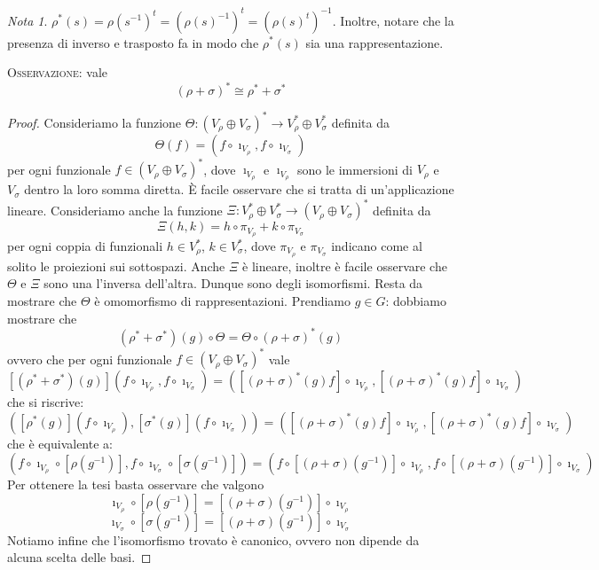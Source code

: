 \documentclass[11pt]{article}
\theoremstyle{plain}
\theoremstyle{definition}
\theoremstyle{remark}
\newtheorem*{note}{Nota}
\begin{document}
\begin{note}
$\rho^*(s)=\rho(s^{-1})^t=\left(\rho(s)^{-1}\right)^t=\left(\rho(s)^t\right)^{-1}$. Inoltre, notare che la presenza di inverso e trasposto fa in modo che $\rho^*(s)$ sia una rappresentazione.
\end{note}


\textsc{Osservazione:} vale
\[ (\rho + \sigma)^* \cong \rho^* + \sigma^* \]
\begin{proof}
Consideriamo la funzione $\Theta : (V_\rho \oplus V_\sigma)^*\to V_\rho ^* \oplus V_\sigma ^*$ definita da
\[ \Theta(f) = (f\circ \imath_{V_\rho}, f\circ \imath_{V_\sigma}) \]
per ogni funzionale $f\in (V_\rho \oplus V_\sigma)^*$, dove $\imath_{V_\rho}$ e $\imath_{V_\rho}$ sono le immersioni di $V_\rho$ e $V_\sigma$ dentro la loro somma diretta.
\`E facile osservare che si tratta di un'applicazione lineare. Consideriamo anche
la funzione $\Xi: V_\rho ^* \oplus V_\sigma ^* \to (V_\rho \oplus V_\sigma)^*$ definita da
\[ \Xi(h,k) = h\circ\pi_{V_\rho} + k\circ\pi_{V_\sigma} \]
per ogni coppia di funzionali $h\in V_\rho ^*$, $k\in V_\sigma ^*$,
dove $\pi_{V_\rho}$ e $\pi_{V_\sigma}$ indicano come al solito le proiezioni sui sottospazi. 
Anche $\Xi$ è lineare, inoltre è facile osservare che $\Theta$ e $\Xi$ sono una l'inversa dell'altra. Dunque sono degli 
isomorfismi. Resta da mostrare che $\Theta$ è omomorfismo di rappresentazioni. Prendiamo $g\in G$: dobbiamo mostrare che 
\[ (\rho^*+\sigma^*)(g) \circ \Theta = \Theta \circ (\rho + \sigma)^*(g) \]
ovvero che per ogni funzionale $f\in (V_\rho \oplus V_\sigma)^*$ vale
\[ [(\rho^*+\sigma^*)(g)] (f\circ \imath_{V_\rho}, f\circ \imath_{V_\sigma}) = ([(\rho + \sigma)^*(g)f]\circ \imath_{V_\rho}, [(\rho + \sigma)^*(g)f]\circ \imath_{V_\sigma}) \]
che si riscrive:
\[ ([\rho^*(g)](f\circ \imath_{V_\rho}), [\sigma^*(g)](f\circ \imath_{V_\sigma})) = ([(\rho + \sigma)^*(g)f]\circ \imath_{V_\rho}, [(\rho + \sigma)^*(g)f]\circ \imath_{V_\sigma}) \]
che è equivalente a:
\[ (f\circ \imath_{V_\rho} \circ [\rho(g^{-1})], f\circ \imath_{V_\sigma}\circ[\sigma(g^{-1})]) = (f\circ [(\rho+\sigma)(g^{-1})] \circ \imath_{V_\rho} , f\circ[(\rho+\sigma)(g^{-1})]\circ \imath_{V_\sigma}) \]
Per ottenere la tesi basta osservare che valgono
\[ \imath_{V_\rho} \circ [\rho(g^{-1})] = [(\rho+\sigma)(g^{-1})] \circ \imath_{V_\rho}\]
\[\imath_{V_\sigma} \circ [\sigma(g^{-1})] = [(\rho+\sigma)(g^{-1})] \circ \imath_{V_\sigma}\]
Notiamo infine che l'isomorfismo trovato è canonico, ovvero non dipende da alcuna scelta delle basi.
\end{proof}
\end{document}
